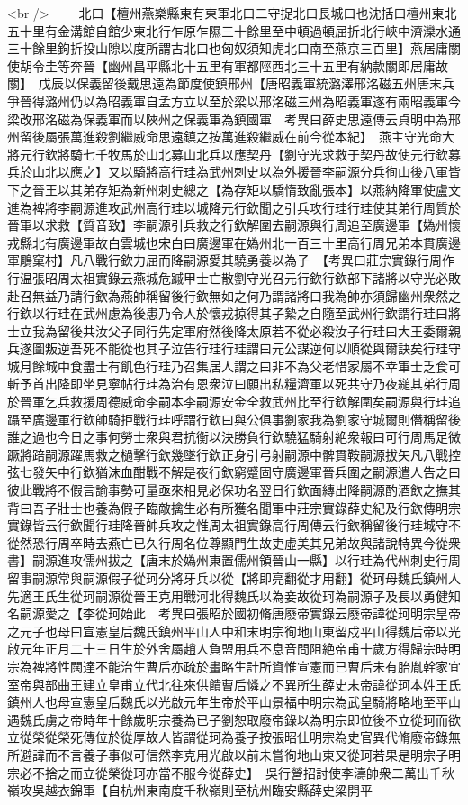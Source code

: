 <br />
　　北口【檀州燕樂縣東有東軍北口二守捉北口長城口也沈括曰檀州東北五十里有金溝館自館少東北行乍原乍隰三十餘里至中頓過頓屈折北行峽中濟灤水通三十餘里鉤折投山隙以度所謂古北口也匈奴須知虎北口南至燕京三百里】燕居庸關使胡令圭等奔晉【幽州昌平縣北十五里有軍都陘西北三十五里有納款關即居庸故關】　戊辰以保義留後戴思遠為節度使鎮邢州【唐昭義軍統潞澤邢洺磁五州唐末兵爭晉得潞州仍以為昭義軍自孟方立以至於梁以邢洺磁三州為昭義軍遂有兩昭義軍今梁改邢洺磁為保義軍而以陜州之保義軍為鎮國軍　考異曰薛史思遠傳云貞明中為邢州留後屬張萬進殺劉繼威命思遠鎮之按萬進殺繼威在前今從本紀】　燕主守光命大將元行欽將騎七千牧馬於山北募山北兵以應契丹【劉守光求救于契丹故使元行欽募兵於山北以應之】又以騎將高行珪為武州刺史以為外援晉李嗣源分兵徇山後八軍皆下之晉王以其弟存矩為新州刺史總之【為存矩以驕惰致亂張本】以燕納降軍使盧文進為裨將李嗣源進攻武州高行珪以城降元行欽聞之引兵攻行珪行珪使其弟行周質於晉軍以求救【質音致】李嗣源引兵救之行欽解圍去嗣源與行周追至廣邊軍【媯州懷戎縣北有廣邊軍故白雲城也宋白曰廣邊軍在媯州北一百三十里高行周兄弟本貫廣邊軍鵰窠村】凡八戰行欽力屈而降嗣源愛其驍勇養以為子　【考異曰莊宗實錄行周作行温張昭周太祖實錄云燕城危䠞甲士亡散劉守光召元行欽行欽部下諸將以守光必敗赴召無益乃請行欽為燕帥稱留後行欽無如之何乃謂諸將曰我為帥亦須歸幽州衆然之行欽以行珪在武州慮為後患乃令人於懷戎掠得其子縶之自隨至武州行欽謂行珪曰將士立我為留後共汝父子同行先定軍府然後降太原若不從必殺汝子行珪曰大王委爾親兵遂圖叛逆吾死不能從也其子泣告行珪行珪謂曰元公謀逆何以順從與爾訣矣行珪守城月餘城中食盡士有飢色行珪乃召集居人謂之曰非不為父老惜家屬不幸軍士乏食可斬予首出降即坐見寧帖行珪為治有恩衆泣曰願出私糧濟軍以死共守乃夜縋其弟行周於晉軍乞兵救援周德威命李嗣本李嗣源安金全救武州比至行欽解圍矣嗣源與行珪追躡至廣邊軍行欽帥騎拒戰行珪呼謂行欽曰與公俱事劉家我為劉家守城爾則僭稱留後誰之過也今日之事何勞士衆與君抗衡以決勝負行欽驍猛騎射絶衆報曰可行周馬足微蹶將踣嗣源躍馬救之檛擊行欽幾墜行欽正身引弓射嗣源中髀貫鞍嗣源拔矢凡八戰控弦七發矢中行欽猶沫血酣戰不解是夜行欽窮蹙固守廣邊軍晉兵圍之嗣源遣人告之曰彼此戰將不假言諭事勢可量亟來相見必保功名翌日行欽面縳出降嗣源酌酒飲之撫其背曰吾子壯士也養為假子臨敵擒生必有所獲名聞軍中莊宗實錄薛史紀及行欽傳明宗實錄皆云行欽聞行珪降晉帥兵攻之惟周太祖實錄高行周傳云行欽稱留後行珪城守不從然恐行周卒時去燕亡已久行周名位尊顯門生故吏虛美其兄弟故與諸說特異今從衆書】嗣源進攻儒州拔之【唐末於媯州東置儒州領晉山一縣】以行珪為代州刺史行周留事嗣源常與嗣源假子從珂分將牙兵以從【將即亮翻從才用翻】從珂母魏氏鎮州人先適王氏生從珂嗣源從晉王克用戰河北得魏氏以為妾故從珂為嗣源子及長以勇健知名嗣源愛之【李從珂始此　考異曰張昭於國初脩唐廢帝實錄云廢帝諱從珂明宗皇帝之元子也母曰宣憲皇后魏氏鎮州平山人中和末明宗徇地山東留戍平山得魏后帝以光啟元年正月二十三日生於外舍屬趙人負盟用兵不息音問阻絶帝甫十歲方得歸宗時明宗為裨將性闊達不能治生曹后亦疏於畫略生計所資惟宣憲而已曹后未有胎胤幹家宜室帝與部曲王建立皇甫立代北往來供饋曹后憐之不異所生薛史末帝諱從珂本姓王氏鎮州人也母宣憲皇后魏氏以光啟元年生帝於平山景福中明宗為武皇騎將略地至平山遇魏氏虜之帝時年十餘歲明宗養為已子劉恕取廢帝錄以為明宗即位後不立從珂而欲立從榮從榮死傳位於從厚故人皆謂從珂為養子按張昭仕明宗為史官異代脩廢帝錄無所避諱而不言養子事似可信然李克用光啟以前未嘗徇地山東又從珂若果是明宗子明宗必不捨之而立從榮從珂亦當不服今從薛史】　吳行營招討使李濤帥衆二萬出千秋嶺攻吳越衣錦軍【自杭州東南度千秋嶺則至杭州臨安縣薛史梁開平